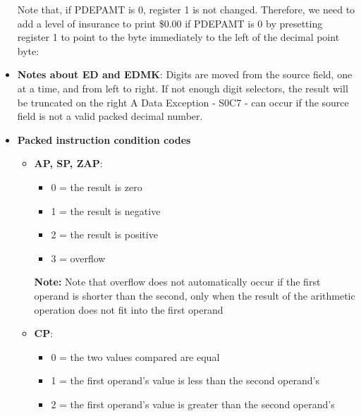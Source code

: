\documentclass{report}
\begin{document}
\begin{itemize}
            \bigbreak \noindent 
            Note that, if PDEPAMT is 0, register 1 is not changed.
            \bigbreak \noindent 
            Therefore, we need to add a level of insurance to print \$0.00 if PDEPAMT is 0 by presetting register 1 to point to the byte immediately to the left of the decimal point byte:
            \bigbreak \noindent 
        \item \textbf{Notes about ED and EDMK}: Digits are moved from the source field, one at a time, and from left to right.
            \bigbreak \noindent 
            If not enough digit selectors, the result will be truncated on the right
            \bigbreak \noindent 
            A Data Exception - S0C7 - can occur if the source field is not a valid packed decimal number.
            \bigbreak \noindent 
        \item \textbf{Packed instruction condition codes}
            \begin{itemize}
                \item \textbf{AP, SP, ZAP}:
                    \begin{itemize}
                        \item 0 = the result is zero
                        \item 1 = the result is negative
                        \item 2 = the result is positive
                        \item 3 = overflow
                    \end{itemize}
                    \bigbreak \noindent 
                    \textbf{Note:} Note that overflow does not automatically occur if the first operand is shorter than the second, only when the result of the arithmetic operation does not fit into the first operand
                \item \textbf{CP}:
                    \begin{itemize}
                        \item 0 = the two values compared are equal
                        \item 1 = the first operand's value is less than the second operand's
                        \item 2 = the first operand's value is greater than the second operand's

\end{itemize}
\end{itemize}
\end{itemize}
\end{document}
